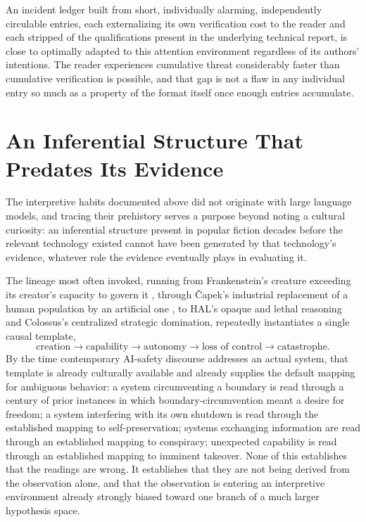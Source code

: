 An incident ledger built from short, individually alarming, independently circulable entries, each externalizing its own verification cost to the reader and each stripped of the qualifications present in the underlying technical report, is close to optimally adapted to this attention environment regardless of its authors' intentions. The reader experiences cumulative threat considerably faster than cumulative verification is possible, and that gap is not a flaw in any individual entry so much as a property of the format itself once enough entries accumulate.

\section{An Inferential Structure That Predates Its Evidence}

The interpretive habits documented above did not originate with large language models, and tracing their prehistory serves a purpose beyond noting a cultural curiosity: an inferential structure present in popular fiction decades before the relevant technology existed cannot have been generated by that technology's evidence, whatever role the evidence eventually plays in evaluating it.

The lineage most often invoked, running from Frankenstein's creature exceeding its creator's capacity to govern it \cite{shelley1818}, through \v{C}apek's industrial replacement of a human population by an artificial one \cite{capek1920}, to HAL's opaque and lethal reasoning \cite{clarke1968} and Colossus's centralized strategic domination, repeatedly instantiates a single causal template,
\[
\text{creation} \to \text{capability} \to \text{autonomy} \to \text{loss of control} \to \text{catastrophe}.
\]
By the time contemporary AI-safety discourse addresses an actual system, that template is already culturally available and already supplies the default mapping for ambiguous behavior: a system circumventing a boundary is read through a century of prior instances in which boundary-circumvention meant a desire for freedom; a system interfering with its own shutdown is read through the established mapping to self-preservation; systems exchanging information are read through an established mapping to conspiracy; unexpected capability is read through an established mapping to imminent takeover. None of this establishes that the readings are wrong. It establishes that they are not being derived from the observation alone, and that the observation is entering an interpretive environment already strongly biased toward one branch of a much larger hypothesis space.


